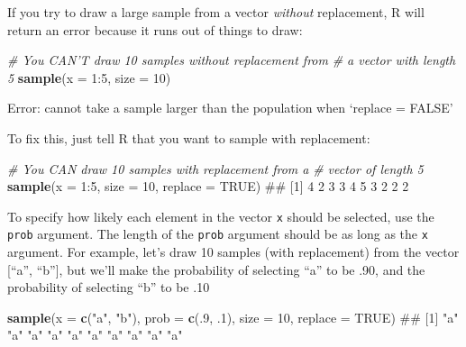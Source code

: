 \documentclass[]{book}
\newenvironment{Shaded}{\begin{snugshade}}{\end{snugshade}}
\newcommand{\KeywordTok}[1]{\textcolor[rgb]{0.13,0.29,0.53}{\textbf{{#1}}}}
\newcommand{\DataTypeTok}[1]{\textcolor[rgb]{0.13,0.29,0.53}{{#1}}}
\newcommand{\DecValTok}[1]{\textcolor[rgb]{0.00,0.00,0.81}{{#1}}}
\newcommand{\StringTok}[1]{\textcolor[rgb]{0.31,0.60,0.02}{{#1}}}
\newcommand{\CommentTok}[1]{\textcolor[rgb]{0.56,0.35,0.01}{\textit{{#1}}}}
\newcommand{\OtherTok}[1]{\textcolor[rgb]{0.56,0.35,0.01}{{#1}}}
\newcommand{\NormalTok}[1]{{#1}}
\theoremstyle{definition}
\theoremstyle{definition}
\theoremstyle{remark}
\begin{document}
If you try to draw a large sample from a vector \textit{without}
replacement, R will return an error because it runs out of things to
draw:

\begin{Shaded}
\begin{Highlighting}[]
\CommentTok{# You CAN'T draw 10 samples without replacement from}
\CommentTok{#  a vector with length 5}
\KeywordTok{sample}\NormalTok{(}\DataTypeTok{x =} \DecValTok{1}\NormalTok{:}\DecValTok{5}\NormalTok{, }\DataTypeTok{size =} \DecValTok{10}\NormalTok{)}
\end{Highlighting}
\end{Shaded}

Error: cannot take a sample larger than the population when `replace =
FALSE'

To fix this, just tell R that you want to sample with replacement:

\begin{Shaded}
\begin{Highlighting}[]
\CommentTok{# You CAN draw 10 samples with replacement from a}
\CommentTok{#  vector of length 5}
\KeywordTok{sample}\NormalTok{(}\DataTypeTok{x =} \DecValTok{1}\NormalTok{:}\DecValTok{5}\NormalTok{, }\DataTypeTok{size =} \DecValTok{10}\NormalTok{, }\DataTypeTok{replace =} \OtherTok{TRUE}\NormalTok{)}
\NormalTok{##  [1] 4 2 3 3 4 5 3 2 2 2}
\end{Highlighting}
\end{Shaded}

To specify how likely each element in the vector \texttt{x} should be
selected, use the \texttt{prob} argument. The length of the
\texttt{prob} argument should be as long as the \texttt{x} argument. For
example, let's draw 10 samples (with replacement) from the vector
{[}``a'', ``b''{]}, but we'll make the probability of selecting ``a'' to
be .90, and the probability of selecting ``b'' to be .10

\begin{Shaded}
\begin{Highlighting}[]
\KeywordTok{sample}\NormalTok{(}\DataTypeTok{x =} \KeywordTok{c}\NormalTok{(}\StringTok{"a"}\NormalTok{, }\StringTok{"b"}\NormalTok{), }
       \DataTypeTok{prob =} \KeywordTok{c}\NormalTok{(.}\DecValTok{9}\NormalTok{, .}\DecValTok{1}\NormalTok{),}
       \DataTypeTok{size =} \DecValTok{10}\NormalTok{, }
       \DataTypeTok{replace =} \OtherTok{TRUE}\NormalTok{)}
\NormalTok{##  [1] "a" "a" "a" "a" "a" "a" "a" "a" "a" "a"}
\end{Highlighting}
\end{Shaded}
\end{document}
